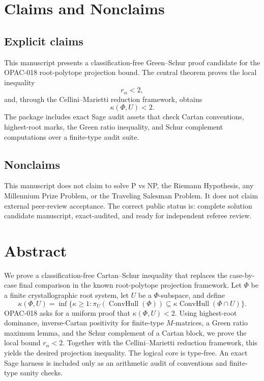 \documentclass[11pt]{book}
\theoremstyle{definition}
\newcommand{\Conv}{\operatorname{ConvHull}}
\newcommand{\GS}{Green--Schur}
\begin{document}
\chapter*{Claims and Nonclaims}
\section*{Explicit claims}
This manuscript presents a classification-free \GS{} proof candidate for the OPAC-018 root-polytope projection bound. The central theorem proves the local inequality
\[
 r_\alpha<2,
\]
and, through the Cellini--Marietti reduction framework, obtains
\[
 \kappa(\Phi,U)<2.
\]
The package includes exact Sage audit assets that check Cartan conventions, highest-root marks, the Green ratio inequality, and Schur complement computations over a finite-type audit suite.

\section*{Nonclaims}
This manuscript does not claim to solve P vs NP, the Riemann Hypothesis, any Millennium Prize Problem, or the Traveling Salesman Problem. It does not claim external peer-review acceptance. The correct public status is: complete solution candidate manuscript, exact-audited, and ready for independent referee review.

\chapter*{Abstract}
We prove a classification-free Cartan--Schur inequality that replaces the case-by-case final comparison in the known root-polytope projection framework. Let $\Phi$ be a finite crystallographic root system, let $U$ be a $\Phi$-subspace, and define
\[
 \kappa(\Phi,U)=\inf\{\kappa\ge 1: \pi_U(\Conv(\Phi))\subseteq \kappa\Conv(\Phi\cap U)\}.
\]
OPAC-018 asks for a uniform proof that $\kappa(\Phi,U)<2$. Using highest-root dominance, inverse-Cartan positivity for finite-type $M$-matrices, a Green ratio maximum lemma, and the Schur complement of a Cartan block, we prove the local bound $r_\alpha<2$. Together with the Cellini--Marietti reduction framework, this yields the desired projection inequality. The logical core is type-free. An exact Sage harness is included only as an arithmetic audit of conventions and finite-type sanity checks.

\tableofcontents
\listoffigures
\end{document}
